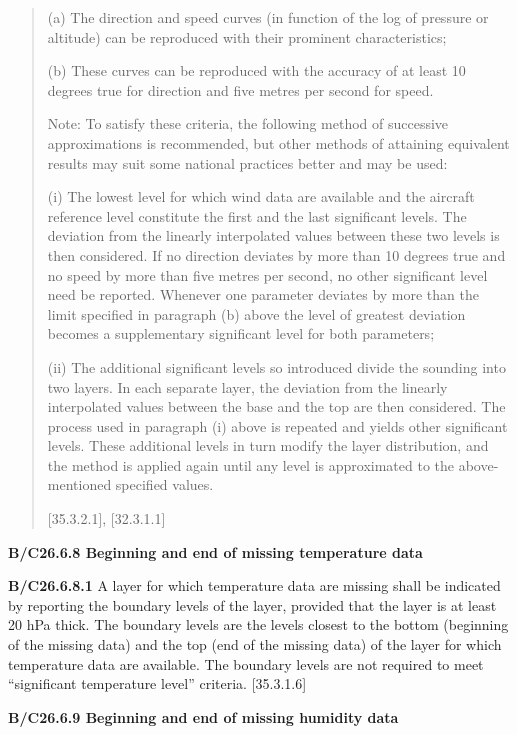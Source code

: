 \begin{quote}
(a) The direction and speed curves (in function of the log of pressure or altitude) can be reproduced with their prominent characteristics;

(b) These curves can be reproduced with the accuracy of at least 10 degrees true for direction and five metres per second for speed.

Note: To satisfy these criteria, the following method of successive approximations is recommended, but other methods of attaining equivalent results may suit some national practices better and may be used:

(i) The lowest level for which wind data are available and the aircraft reference level constitute the first and the last significant levels. The deviation from the linearly interpolated values between these two levels is then considered. If no direction deviates by more than 10 degrees true and no speed by more than five metres per second, no other significant level need be reported. Whenever one parameter deviates by more than the limit specified in paragraph (b) above the level of greatest deviation becomes a supplementary significant level for both parameters;

(ii) The additional significant levels so introduced divide the sounding into two layers. In each separate layer, the deviation from the linearly interpolated values between the base and the top are then considered. The process used in paragraph (i) above is repeated and yields other significant levels. These additional levels in turn modify the layer distribution, and the method is applied again until any level is approximated to the above-mentioned specified values.

{[}35.3.2.1{]}, {[}32.3.1.1{]}
\end{quote}

\textbf{B/C26.6.8 Beginning and end of missing temperature data}

\textbf{B/C26.6.8.1} A layer for which temperature data are missing shall be indicated by reporting the boundary levels of the layer, provided that the layer is at least 20 hPa thick. The boundary levels are the levels closest to the bottom (beginning of the missing data) and the top (end of the missing data) of the layer for which temperature data are available. The boundary levels are not required to meet ``significant temperature level'' criteria. {[}35.3.1.6{]}

\textbf{B/C26.6.9 Beginning and end of missing humidity data}

